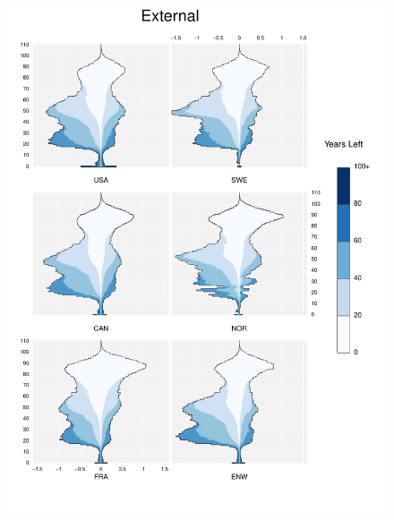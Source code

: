 \documentclass{article}
\begin{document}
\begin{appendices}
\begin{figure}
\includegraphics[scale=.8]{Figures/Causes/DxyExternal.pdf}
\end{figure}
\begin{figure}
\centering

\end{figure}
\end{appendices}
\end{document}
